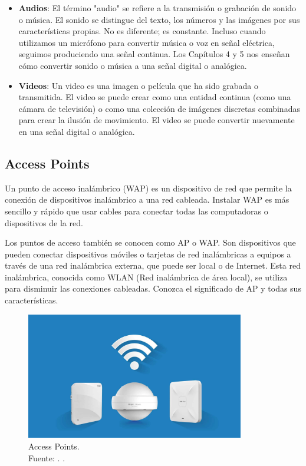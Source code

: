 \begin{itemize}
	\item \textbf{Audios}: El término "audio" se refiere a la transmisión o grabación de sonido o música. El sonido se distingue del texto, los números y las imágenes por sus características propias. No es diferente; es constante. Incluso cuando utilizamos un micrófono para convertir música o voz en señal eléctrica, seguimos produciendo una señal continua. Los Capítulos 4 y 5 nos enseñan cómo convertir sonido o música a una señal digital o analógica. \parencite{tec_singh2011perfommobil}
	\item \textbf{Videos}: Un video es una imagen o película que ha sido grabada o transmitida. El video se puede crear como una entidad continua (como una cámara de televisión) o como una colección de imágenes discretas combinadas para crear la ilusión de movimiento. El video se puede convertir nuevamente en una señal digital o analógica. \parencite{tec_karnik2005wirnetwo}
\end{itemize}

\subsection{Access Points}
Un punto de acceso inalámbrico (WAP) es un dispositivo de red que permite la conexión de dispositivos inalámbrico a una red cableada. Instalar WAP es más sencillo y rápido que usar cables para conectar todas las computadoras o dispositivos de la red. \parencite{ot_cisco2024queesap}

Los puntos de acceso también se conocen como AP o WAP. Son dispositivos que pueden conectar dispositivos móviles o tarjetas de red inalámbricas a equipos a través de una red inalámbrica externa, que puede ser local o de Internet. Esta red inalámbrica, conocida como WLAN (Red inalámbrica de área local), se utiliza para disminuir las conexiones cableadas. Conozca el significado de AP y todas sus características. \parencite{ot_ymant2023ap}

\begin{figure}[!ht]
	\begin{center}
		\includegraphics[width=0.85\textwidth]{2/figures/accesspoints.jpg}
		\caption[Access Points]{Access Points.\\
			Fuente: \cite{ot_cisco2024queesap}. .}
		\label{2:fig52}
	\end{center}
\end{figure}

